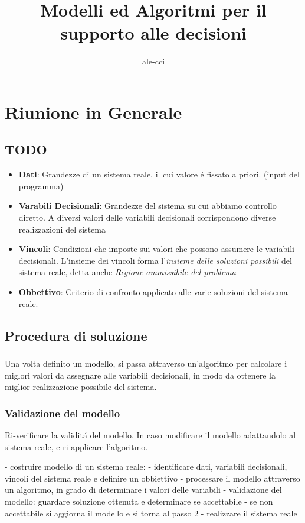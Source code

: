 \documentclass{article}
\title{Modelli ed Algoritmi per il supporto alle decisioni}
\author{ale-cci}
\begin{document}
\maketitle{}
\section{Riunione in Generale}
\subsection{TODO}
\begin{itemize}
    \item \textbf{Dati}:
        Grandezze di un sistema reale, il cui valore é fissato a priori. (input del programma)
    \item \textbf{Varabili Decisionali}:
        Grandezze del sistema su cui abbiamo controllo diretto.
        A diversi valori delle variabili decisionali corrispondono diverse realizzazioni del sistema
    \item \textbf{Vincoli}:
        Condizioni che imposte sui valori che possono assumere le variabili decisionali.
        L'insieme dei vincoli forma l'\textit{insieme delle soluzioni possibili} del sistema reale,
        detta anche \textit{Regione ammissibile del problema}
    \item \textbf{Obbettivo}:
        Criterio di confronto applicato alle varie soluzioni del sistema reale.
\end{itemize}

\subsection{Procedura di soluzione}

\subsubsection{}
Una volta definito un modello, si passa attraverso un'algoritmo per calcolare i miglori valori da assegnare alle variabili decisionali, in modo da ottenere la miglior realizzazione possibile del sistema.

\subsubsection{Validazione del modello}
Ri-verificare la validitá del modello. In caso modificare il modello adattandolo al sistema reale, e ri-applicare l'algoritmo.

- costruire modello di un sistema reale:
    - identificare dati, variabili decisionali, vincoli del sistema reale e definire un obbiettivo
- processare il modello attraverso un algoritmo, in grado di determinare i valori delle variabili
-  validazione del modello: guardare soluzione ottenuta e determinare se accettabile
    - se non accettabile si aggiorna il modello e si torna al passo 2
- realizzare il sistema reale
\end{document}
